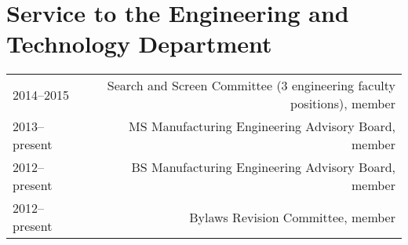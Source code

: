 \section*{Service to the Engineering and Technology Department}
\begin{tabular}{L!{\VRule}R}
2014--2015&Search and Screen Committee (3 engineering faculty positions), member\\
2013--present&MS Manufacturing Engineering Advisory Board, member\\
2012--present&BS Manufacturing Engineering Advisory Board, member\\
2012--present&Bylaws Revision Committee, member
\end{tabular}